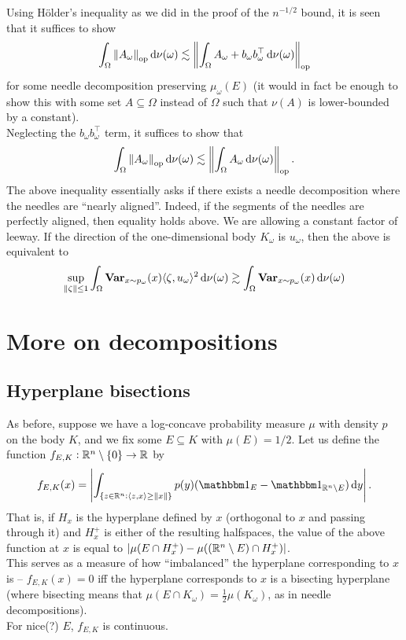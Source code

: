 \documentclass{article}
\begin{document}
		Using H\"{o}lder's inequality as we did in the proof of the $n^{-1/2}$ bound, it is seen that it suffices to show
		\[ \int_\Omega \left\lVert A_\omega\right\rVert_{\text{op}} \operatorname{d}\!{\nu(\omega)} \lesssim \left\lVert \int_\Omega A_\omega + b_\omega b_\omega^\top \operatorname{d}\!{\nu(\omega)} \right\rVert_{\text{op}} \]
		for some needle decomposition preserving $\mu_\omega(E)$ (it would in fact be enough to show this with some set $A\subseteq \Omega$ instead of $\Omega$ such that $\nu(A)$ is lower-bounded by a constant).\\
		Neglecting the $b_\omega b_\omega^\top$ term, it suffices to show that
		\begin{equation}
			\label{eqn: needle nearly aligned}
			\int_\Omega \left\lVert A_\omega\right\rVert_{\text{op}} \operatorname{d}\!{\nu(\omega)} \lesssim \left\lVert \int_\Omega A_\omega \operatorname{d}\!{\nu(\omega)} \right\rVert_{\text{op}}.
		\end{equation}
		The above inequality essentially asks if there exists a needle decomposition where the needles are ``nearly aligned''. Indeed, if the segments of the needles are perfectly aligned, then equality holds above. We are allowing a constant factor of leeway. If the direction of the one-dimensional body $K_\omega$ is $u_\omega$, then the above is equivalent to
		\begin{equation}
			\sup_{\norm{\zeta} \leq 1} \int_\Omega \Var_{x \sim p_\omega}(x) \langle \zeta , u_\omega \rangle^2 \dif \nu(\omega) \gtrsim \int_\Omega \Var_{x \sim p_\omega}(x) \dif \nu(\omega)	
		\end{equation}

\section{More on decompositions}

	\subsection{Hyperplane bisections}

		As before, suppose we have a log-concave probability measure $\mu$ with density $p$ on the body $K$, and we fix some $E \subseteq K$ with $\mu(E) = 1/2$. Let us define the function $f_{E,K} : \mathbb{R}^n \setminus \{0\} \to \mathbb{R}$ by
		\[ f_{E,K}(x) = \left| \int_{\{ z \in \Rn : \langle z , x \rangle \geq \norm{x} \}} p(y) ( \indic_E - \indic_{\Rn \setminus E} ) \dif y \right|. \]
		That is, if $H_x$ is the hyperplane defined by $x$ (orthogonal to $x$ and passing through it) and $H_x^+$ is either of the resulting halfspaces, the value of the above function at $x$ is equal to $|\mu(E \cap H_x^+) - \mu((\mathbb{R}^n\setminus E) \cap H_x^+)|$.\\
		This serves as a measure of how ``imbalanced'' the hyperplane corresponding to $x$ is -- $f_{E,K}(x) = 0$ iff the hyperplane corresponds to $x$ is a bisecting hyperplane (where bisecting means that $\mu(E \cap K_\omega) = \frac{1}{2} \mu(K_\omega) $, as in needle decompositions).\\
		For nice(?) $E$, $f_{E,K}$ is continuous.\\
\end{document}
